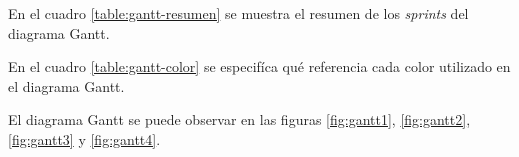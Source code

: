 \documentclass[
11pt, %
]{charter}
\begin{document}











En el cuadro \ref{table:gantt-resumen} se muestra el resumen de los \textit{sprints} del diagrama Gantt.

En el cuadro \ref{table:gantt-color} se especifíca qué referencia cada color utilizado en el diagrama Gantt.

El diagrama Gantt se puede observar en las figuras \ref{fig:gantt1}, \ref{fig:gantt2}, \ref{fig:gantt3} y \ref{fig:gantt4}.
\end{document}
